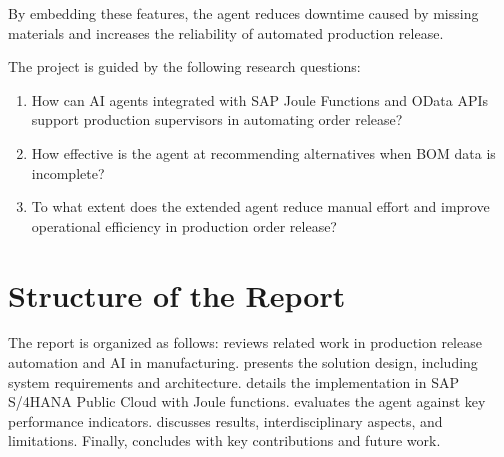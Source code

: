 By embedding these features, the agent reduces downtime caused by missing materials and increases the reliability of automated production release.

The project is guided by the following research questions:
\begin{enumerate}
  \item How can AI agents integrated with SAP Joule Functions and OData APIs support production supervisors in automating order release?
  \item How effective is the agent at recommending alternatives when BOM data is incomplete?
  \item To what extent does the extended agent reduce manual effort and improve operational efficiency in production order release?
\end{enumerate}

\section{Structure of the Report}
The report is organized as follows: 
 reviews related work in production release automation and AI in manufacturing. 
 presents the solution design, including system requirements and architecture. 
 details the implementation in SAP S/4HANA Public Cloud with Joule functions. 
 evaluates the agent against key performance indicators. 
 discusses results, interdisciplinary aspects, and limitations. 
Finally,  concludes with key contributions and future work.